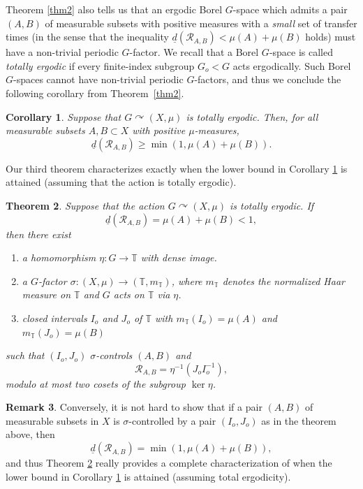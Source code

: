 \documentclass[11pt]{article}
\numberwithin{equation}{section}
\let\mathcal\mathscr
\newcommand{\cR}{\mathcal{R}}
\newcommand{\bT}{\mathbb{T}}
\let\acts\curvearrowright
\theoremstyle{plain}
\newtheorem{theorem}{Theorem}[section]
\newtheorem{corollary}[theorem]{Corollary}
\theoremstyle{definition}
\newtheorem{remark}[theorem]{Remark}
\begin{document}
Theorem \ref{thm2} also tells us that an ergodic Borel $G$-space which admits a pair $(A,B)$ of measurable subsets with positive measures with
a \emph{small} set of transfer times (in the sense that the inequality $\underline{d}(\cR_{A,B}) < \mu(A) + \mu(B)$ holds) must have a non-trivial periodic $G$-factor. We recall that a Borel $G$-space is called \emph{totally ergodic} if every finite-index subgroup $G_o < G$ acts ergodically. Such Borel $G$-spaces cannot have non-trivial periodic $G$-factors, and thus we conclude the following corollary from Theorem~\ref{thm2}.

\begin{corollary}
\label{cor_toterg}
Suppose that $G \acts (X,\mu)$ is totally ergodic. Then, for all measurable subsets $A, B \subset X$ with positive $\mu$-measures,
\[
\underline{d}(\cR_{A,B}) \geq \min(1,\mu(A) + \mu(B)).
\]
\end{corollary}

Our third theorem characterizes exactly when the lower bound in Corollary \ref{cor_toterg} is attained (assuming that the action is totally ergodic).

\begin{theorem}
\label{thm3}
Suppose that the action $G \acts (X,\mu)$ is totally ergodic. If
\[
\underline{d}(\cR_{A,B}) = \mu(A) + \mu(B) < 1,
\]
then there exist

\begin{enumerate}
\item
a homomorphism $\eta : G \to \bT$ with dense image.
\item
a $G$-factor $\sigma : (X,\mu) \to (\bT,m_{\bT})$, where $m_{\bT}$ denotes the normalized Haar measure on $\bT$
and $G$ acts on $\bT$ via $\eta$.
\item
closed intervals $I_o$ and $J_o$ of $\bT$ with $m_{\bT}(I_o) = \mu(A)$ and $m_{\bT}(J_o) = \mu(B)$
\end{enumerate}
such that $(I_o,J_o)$ $\sigma$-controls $(A,B)$ and
\[
\cR_{A,B} = \eta^{-1}(J_o I_o^{-1}),
\]
modulo at most two cosets of the subgroup $\ker \eta$.
\end{theorem}

\begin{remark}
Conversely, it is not hard to show that if a pair $(A,B)$ of measurable subsets in $X$ is $\sigma$-controlled by a pair $(I_o,J_o)$ as in the theorem above, then
\[
\underline{d}(\cR_{A,B}) = \min(1,\mu(A) + \mu(B)),
\]
and thus Theorem \ref{thm3} really provides a complete characterization of when the lower bound in Corollary \ref{cor_toterg} is attained (assuming total ergodicity).
\end{remark}
\end{document}
